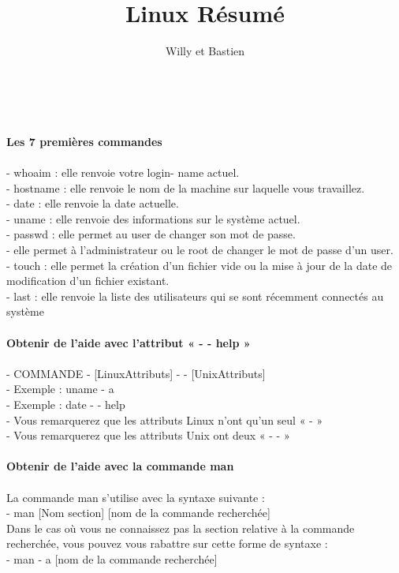 \documentclass[10pt,a4paper]{article}
\begin{document}
\title{ Linux Résumé} 
 \maketitle 
\author{Willy et Bastien}\\\\
{\large\textbf{Les 7 premières commandes}}\\\\
- whoaim : elle renvoie votre login- name actuel.\\
- hostname : elle renvoie le nom de la machine sur laquelle vous travaillez.\\
- date : elle renvoie la date actuelle.\\
- uname : elle renvoie des informations sur le système actuel.\\
- passwd :  elle permet au user de changer son mot de passe.\\
- elle permet à l’administrateur ou le root de changer le mot  de passe d’un user. \\
- touch : elle permet la création d’un fichier vide ou la mise à jour de la date de modification d’un fichier existant.\\
- last : elle renvoie la liste des utilisateurs qui se sont récemment connectés au système\\\\
{\large\textbf{Obtenir de l’aide avec l’attribut « - - help »}}\\\\
- COMMANDE - [LinuxAttributs] - - [UnixAttributs] \\
- Exemple : uname - a \\
- Exemple : date - - help \\
- Vous remarquerez que les attributs Linux n’ont qu’un seul « - » \\
- Vous remarquerez que les attributs Unix ont deux « - - » \\\\
{\large\textbf{Obtenir de l’aide avec la commande man}}\\\\
 La commande man s’utilise avec la syntaxe suivante :  \\
- man [Nom section] [nom de la commande recherchée] \\
Dans le cas où vous ne connaissez pas la section relative à la commande recherchée, vous pouvez vous rabattre sur cette forme de syntaxe : \\
- man - a [nom de la commande recherchée] \\
\end{document}
